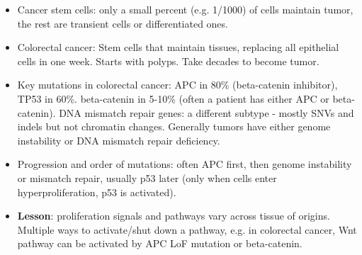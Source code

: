 \documentclass{report}
\begin{document}
\begin{itemize}
	\item Cancer stem cells: only a small percent (e.g. 1/1000) of cells maintain tumor, the rest are transient cells or differentiated ones. 
	
	\item Colorectal cancer: Stem cells that maintain tissues, replacing all epithelial cells in one week. Starts with polyps. Take decades to become tumor. 
	
	\item Key mutations in colorectal cancer: APC in 80\% (beta-catenin inhibitor), TP53 in 60\%. beta-catenin in 5-10\% (often a patient has either APC or beta-catenin). DNA mismatch repair genes: a different subtype - mostly SNVs and indels but not chromatin changes. Generally tumors have either genome instability or DNA mismatch repair deficiency. 
	
	\item Progression and order of mutations: often APC first, then genome instability or mismatch repair, usually p53 later (only when cells enter hyperproliferation, p53 is activated). 
	
	\item \textbf{Lesson}: proliferation signals and pathways vary across tissue of origins. Multiple ways to activate/shut down a pathway, e.g. in colorectal cancer, Wnt pathway can be activated by APC LoF mutation or beta-catenin. 
\end{itemize}
\end{document}
